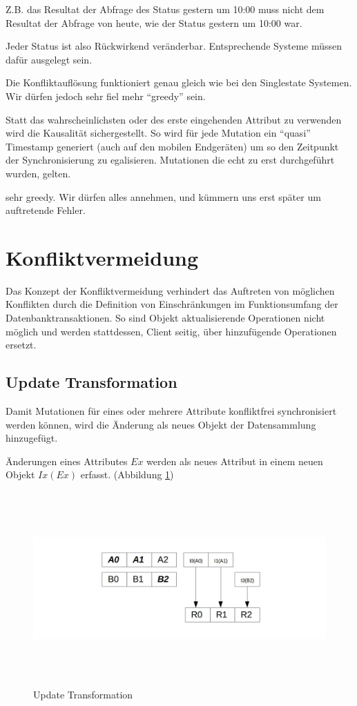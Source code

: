 \documentclass[oneside,11pt,parskip=half,ngerman]{scrreprt}
\makeatletter
\def\maxwidth{\ifdim\Gin@nat@width>\linewidth\linewidth
\else\Gin@nat@width\fi}
\let\Oldincludegraphics\includegraphics
\renewcommand{\includegraphics}[1]{\Oldincludegraphics[width=\maxwidth,height=20em,keepaspectratio]{#1}}
\makeatother
\begin{document}
Z.B. das Resultat der Abfrage des Status gestern um 10:00 muss nicht dem
Resultat der Abfrage von heute, wie der Status gestern um 10:00 war.

Jeder Status ist also Rückwirkend veränderbar. Entsprechende Systeme
müssen dafür ausgelegt sein.

Die Konfliktauflösung funktioniert genau gleich wie bei den Singlestate
Systemen. Wir dürfen jedoch sehr fiel mehr \enquote{greedy} sein.

Statt das wahrscheinlichsten oder des erste eingehenden Attribut zu
verwenden wird die Kausalität sichergestellt. So wird für jede Mutation
ein \enquote{quasi} Timestamp generiert (auch auf den mobilen
Endgeräten) um so den Zeitpunkt der Synchronisierung zu egalisieren.
Mutationen die echt zu erst durchgeführt wurden, gelten.

sehr greedy. Wir dürfen alles annehmen, und kümmern uns erst später um
auftretende Fehler.

\newpage

\section{Konfliktvermeidung}\label{konfliktvermeidung}

Das Konzept der Konfliktvermeidung verhindert das Auftreten von
möglichen Konflikten durch die Definition von Einschränkungen im
Funktionsumfang der Datenbanktransaktionen. So sind Objekt
aktualisierende Operationen nicht möglich und werden stattdessen, Client
seitig, über hinzufügende Operationen ersetzt.

\subsection{Update Transformation}\label{update-transformation}

Damit Mutationen für eines oder mehrere Attribute konfliktfrei
synchronisiert werden können, wird die Änderung als neues Objekt der
Datensammlung hinzugefügt.

Änderungen eines Attributes \(Ex\) werden als neues Attribut in einem
neuen Objekt \(Ix(Ex)\) erfasst. (Abbildung \ref{fig:updatetransform})

\begin{figure}[htbp]
\centering
\includegraphics{img/update-transformation.jpg}
\caption{Update Transformation\label{fig:updatetransform}}
\end{figure}
\end{document}
